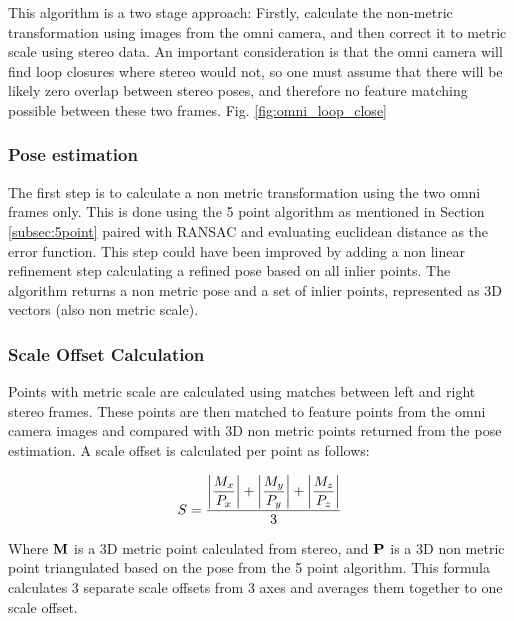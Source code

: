 This algorithm is a two stage approach: Firstly, calculate the non-metric transformation using images from the omni camera, and then correct it to metric scale using stereo data.  An important consideration is that the omni camera will find loop closures where stereo would not, so one must assume that there will be likely zero overlap between stereo poses, and therefore no feature matching possible between these two frames. Fig. \ref{fig:omni_loop_close}

\subsubsection{Pose estimation}

The first step is to calculate a non metric transformation using the two omni frames only.  This is done using the 5 point algorithm as mentioned in Section \ref{subsec:5point} paired with RANSAC and evaluating euclidean distance as the error function.  This step could have been improved by adding a non linear refinement step calculating a refined pose based on all inlier points.  The algorithm returns a non metric pose and a set of inlier points, represented as 3D vectors (also non metric scale).

\subsubsection{Scale Offset Calculation}

Points with metric scale are calculated using matches between left and right stereo frames.  These points are then matched to feature points from the omni camera images and compared with 3D non metric points returned from the pose estimation.  A scale offset is calculated per point as follows:

\begin{align}
  \centering
   S =
   \displaystyle\frac{
   \left|\displaystyle\frac{ {M}_{x}}{ P_{x}}\right| + 
   \left|\displaystyle\frac{ {M}_{y}}{ P_{y}}\right| + 
   \left|\displaystyle\frac{ {M}_{z}}{ P_{z}}\right|
   }
   {3}
  \label{eq:scale_offset}
\end{align}

Where $\mathbf{M}$ is a 3D metric point calculated from stereo, and $\mathbf{P}$ is a 3D non metric point triangulated based on the pose from the 5 point algorithm.  This formula calculates 3 separate scale offsets from 3 axes and averages them together to one scale offset. 

